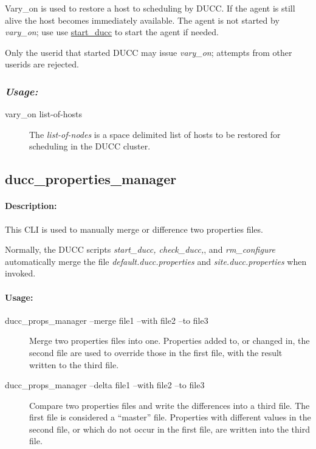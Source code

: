     Vary\_on is used to restore a host to scheduling by DUCC.  If the agent is still
    alive the host becomes immediately available.  The agent is not started by
    {\em vary\_on}; use use 
    \hyperref[subsec:admin.start-ducc]{start\_ducc} to start the agent if needed.

    Only the userid that started DUCC may issue {\em vary\_on}; attempts from other userids
    are rejected.
    
    \subsubsection{\em{Usage: }}

        \begin{description} 
          \item[vary\_on list-of-hosts]
            The {\em list-of-nodes} is a space delimited list of hosts to be restored for
              scheduling in the DUCC cluster.
        \end{description}
            
       
\subsection{ducc\_properties\_manager}
\label{sec:cli.ducc-properties-manager}

    \paragraph{Description:}
    This CLI is used to manually merge or difference two properties files. 

    Normally, the DUCC scripts {\em start\_ducc, check\_ducc,}, and {\em rm\_configure} automatically
    merge the file {\em default.ducc.properties} and {\em site.ducc.properties} when invoked.  

    \paragraph{Usage:}
    \begin{description}
    \item[ducc\_props\_manager --merge file1 --with file2 --to file3]
      Merge two properties files into one.  Properties added to, or changed in, the second file
      are used to override those in the first file, with the result written to the third file.
    \item[ducc\_props\_manager --delta file1 --with file2 --to file3]
      Compare two properties files and write the differences into a third file.  The first file is
      considered a ``master'' file.  Properties with different values in the second file, or which
      do not occur in the first file, are written into the third file.
    \end{description}

